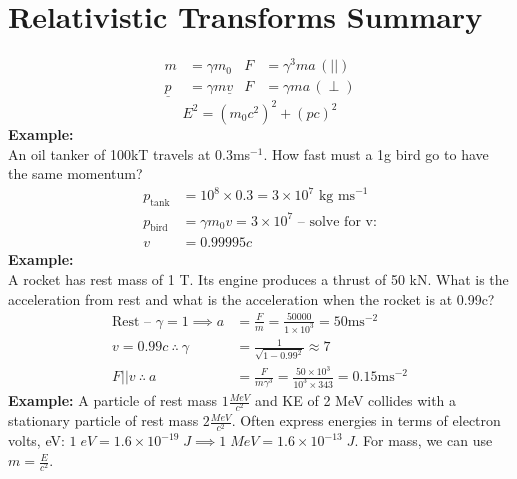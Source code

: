 \documentclass[a4paper, 11pt, normalem]{report}
\begin{document}
\section{Relativistic Transforms Summary}
\begin{align}
    m &= \gamma m_{0} & F &= \gamma^{3}ma\,(||) \\
    \underline{p} &= \gamma m\underline{v} & F &= \gamma ma\,(\perp)
\end{align}
\begin{equation}
    E^{2} = (m_{0}c^{2})^{2} + (pc)^{2}
\end{equation}
\textbf{Example:}\\
An oil tanker of 100kT travels at 0.3ms$^{-1}$.
How fast must a 1g bird go to have the same momentum?
\begin{align}
    p_{\text{tank}} &= 10^{8}\times0.3 = 3\times10^{7}\text{ kg ms}^{-1}\\
    p_{\text{bird}} &= \gamma m_{0}v = 3\times10^{7}\text{ -- solve for v:} \\
    v &= 0.99995c
\end{align}
\textbf{Example:}\\
A rocket has rest mass of 1 T.
Its engine produces a thrust of 50 kN.
What is the acceleration from rest and what is the acceleration when the rocket is at 0.99c?
\begin{align}
    \text{Rest -- }\gamma = 1 \implies a &= \frac{F}{m} = \frac{50000}{1\times10^{3}} = 50\text{ms}^{-2} \\
    v = 0.99c~\therefore~\gamma &= \frac{1}{\sqrt{1 - 0.99^{2}}} \approx 7 \\
    F || v ~\therefore~ a &= \frac{F}{m\gamma^{3}} = \frac{50\times10^{3}}{10^{3}\times343} = 0.15\text{ms}^{-2}
\end{align}
\textbf{Example:}
A particle of rest mass $1\frac{MeV}{c^{2}}$ and KE of 2 MeV collides with a stationary particle of rest mass $2\frac{MeV}{c^{2}}$.
Often express energies in terms of electron volts, eV: $1\;eV = 1.6\times10^{-19}\;J \implies 1\;MeV = 1.6\times10^{-13}\;J$.
For mass, we can use $m = \frac{E}{c^{2}}$.
\end{document}
